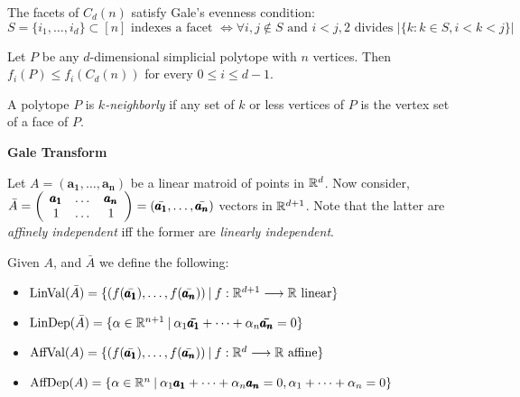 \begin{obs}
    The facets of $C_d(n)$ satisfy Gale's evenness condition:
    $$ S = \lbrace i_1, \dots, i_d \rbrace \subset [n] \text{ indexes a facet } \Leftrightarrow \forall i,j \not\in S \text{ and } i < j, 2 \text{ divides } |\{k : k \in S, i < k < j\}|$$
\end{obs}

\begin{theorem}
    Let $P$ be any $d$-dimensional simplicial polytope with $n$ vertices. Then $f_i(P) \leq f_i(C_d(n))$ for every $0 \leq i \leq d-1$.
\end{theorem}

\begin{definition}[k-neighbourness]
    A polytope $P$ is \textit{$k$-neighborly} if any set of $k$ or less vertices of $P$ is the vertex set of a face of $P$.
\end{definition}

\textbf{Gale Transform}

Let $A = (\pmb{a_1}, \dots, \pmb{a_n})$ be a linear matroid of points in $\mathbb{R}^d$.
Now consider, $\bar{A} = \left( \begin{array}{c c c} \pmb{a_1} & \dots & \pmb{a_n} \\ 1 & \dots & 1 \end{array} \right) = (\bar{\pmb{a_1}}, \dots, \bar{\pmb{a_n}})$ vectors in $\mathbb{R}^{d+1}$.
Note that the latter are \textit{affinely independent} iff the former are \textit{linearly independent}.
\begin{definition}
    Given $A$, and $\bar{A}$ we define the following:
    \begin{itemize}
        \item $\text{LinVal}(\bar{A}) = \{(f(\bar{\pmb{a_1}}), \dots, f(\bar{\pmb{a_n}})) \: | \: f: \mathbb{R}^{d+1} \longrightarrow \mathbb{R} \text{ linear} \}$
        \item $\text{LinDep}(\bar{A}) = \{ \alpha \in \mathbb{R}^{n+1} \: | \: \alpha_1 \pmb{\bar{a_1}} + \dots + \alpha_n \pmb{\bar{a_n}} = 0 \}$
        \item $\text{AffVal}(A) = \{(f(\bar{\pmb{a_1}}), \dots, f(\bar{\pmb{a_n}})) \: | \: f: \mathbb{R}^{d} \longrightarrow \mathbb{R} \text{ affine} \}$
        \item $\text{AffDep}(A) = \{ \alpha \in \mathbb{R}^n \: | \: \alpha_1 \pmb{a_1} + \dots + \alpha_n \pmb{a_n} = 0, \alpha_1 + \dots + \alpha_n = 0 \}$
    \end{itemize}
\end{definition}


